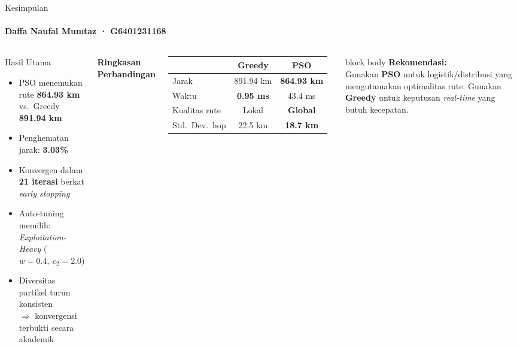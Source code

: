 \documentclass[aspectratio=169,10pt]{beamer}
\newcommand{\sectiontitle}[1]{%
  {\large\bfseries #1}%
}
\begin{document}
\begin{frame}{Kesimpulan}
  \framesubtitle{Daffa Naufal Mumtaz · G6401231168}
  \begin{columns}[T,totalwidth=\textwidth]
    \begin{block}{Hasil Utama}
      \begin{itemize}
        \item PSO menemukan rute \textbf{864.93 km} vs.\
              Greedy \textbf{891.94 km}
        \item Penghematan jarak: \textbf{3.03\%}
        \item Konvergen dalam \textbf{21 iterasi} berkat \textit{early stopping}
        \item Auto-tuning memilih:\\
              \textit{Exploitation-Heavy} ($w{=}0.4,\ c_2{=}2.0$)
        \item Diversitas partikel turun konsisten\\
              $\Rightarrow$ konvergensi terbukti secara akademik
      \end{itemize}
    \end{block}

    \sectiontitle{Ringkasan Perbandingan}
    \vspace{0.2cm}

    \begin{tabular}{@{}lcc@{}}
      \toprule
                          & \textbf{Greedy} & \textbf{PSO} \\
      \midrule
      Jarak               & 891.94 km    & \textbf{864.93 km} \\
      Waktu               & \textbf{0.95 ms} & 43.4 ms \\
      Kualitas rute       & Lokal           & \textbf{Global} \\
      Std.\ Dev.\ hop     & 22.5 km         & \textbf{18.7 km} \\
      \bottomrule
    \end{tabular}

    \vspace{0.3cm}
    \begin{beamercolorbox}[wd=\linewidth,sep=8pt,rounded=true]{block body}
      \small\textbf{Rekomendasi:}\\[3pt]
      Gunakan \textbf{PSO} untuk logistik/distribusi
      yang mengutamakan optimalitas rute.
      Gunakan \textbf{Greedy} untuk keputusan
      \textit{real-time} yang butuh kecepatan.
    \end{beamercolorbox}
  \end{columns}
\end{frame}
\end{document}
